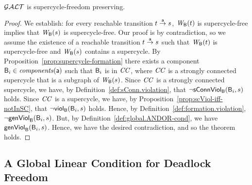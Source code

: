 \begin{theorem} \label{thm:GAO.SC-free-preserving}
$\mathcal{GALT}$ is supercycle-freedom preserving.
\end{theorem}
%
\begin{proof}
We establish:
for every reachable transition $t \stackrel{\mathsf{a}}{\rightarrow} s$,
$\mathit{W}_{\mathsf{B}}({t})$ is supercycle-free implies that $\mathit{W}_{\mathsf{B}}({s})$ is
supercycle-free. Our proof is by contradiction, so we assume the existence of a reachable transition
$t \stackrel{\mathsf{a}}{\rightarrow} s$ such that $\mathit{W}_{\mathsf{B}}({t})$ is supercycle-free and $\mathit{W}_{\mathsf{B}}({s})$ contains a supercycle.
%
By Proposition~\ref{prop:supercycle-formation}
 there exists a component $\mathsf{B}_i \in \mathit{components}(\mathsf{a})$ such that $\mathsf{B}_i$ is in $\mathit{CC}$, where 
$\mathit{CC}$ is a strongly connected supercycle that is a subgraph of $\mathit{W}_{\mathsf{B}}({s})$.
%
Since $\mathit{CC}$ is a strongly connected supercycle, we have,
 by Definition~\ref{def:sConn.violation}, that $\neg \mathsf{sConnViol}_{\mathsf{B}}(\mathsf{B}_i,s)$ holds.
%
Since $\mathit{CC}$ is a supercycle, we have, by Proposition~\ref{prop:scViol-iff-notInSC}, 
that $\neg \mathsf{viol}_{\mathsf{B}}(\mathsf{B}_i,s)$ holds. 
%
Hence, by Definition~\ref{def:formation.violation}, $\neg \mathsf{genViol}_{\mathsf{B}}(\mathsf{B}_i,s)$.
But, by Definition~\ref{def:global.ANDOR-cond}, we have $\mathsf{genViol}_{\mathsf{B}}(\mathsf{B}_i,s)$.
Hence, we have the desired contradiction, and so the theorem holds.
\end{proof}









   \subsection{A Global Linear Condition for Deadlock Freedom}
   \label{s:globCondition}
   \label{s:global.Linear}
%   

